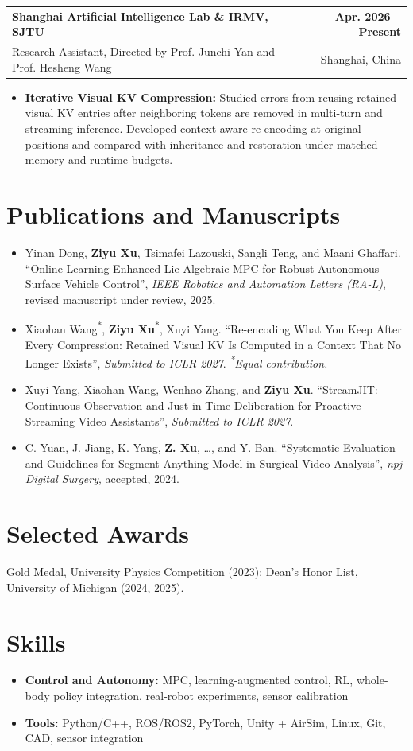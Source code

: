 \documentclass[11pt,letterpaper]{article}
\makeatletter
\newcommand{\resumeSubheading}[4]{
    \begin{tabularx}{\textwidth}{@{}Xr@{}}
        \textbf{#1} & \textbf{#2} \\
        #3 & #4 \\
    \end{tabularx}
}
\newcommand{\resumeItem}[1]{
    \item #1
}
\makeatother
\begin{document}
\resumeSubheading
{Shanghai Artificial Intelligence Lab \& IRMV, SJTU }
{Apr. 2026 -- Present}
{\hspace*{1.4em}Research Assistant, Directed by Prof. Junchi Yan and Prof. Hesheng Wang}
{Shanghai, China}
\begin{itemize}[leftmargin=2.4em, itemsep=0.5pt, topsep=0pt]
\small
\resumeItem{\textbf{Iterative Visual KV Compression:} Studied errors from reusing retained visual KV entries after neighboring tokens are removed in multi-turn and streaming inference. Developed context-aware re-encoding at original positions and compared with inheritance and restoration under matched memory and runtime budgets.}
\end{itemize}

\section*{Publications and Manuscripts}
\begin{itemize}[leftmargin=1.4em,itemsep=3pt,topsep=2pt]
\small
\item Yinan Dong, \textbf{Ziyu Xu}, Tsimafei Lazouski, Sangli Teng, and Maani Ghaffari.      ``Online Learning-Enhanced Lie Algebraic MPC for Robust Autonomous Surface Vehicle Control'',      \textit{IEEE Robotics and Automation Letters (RA-L)}, revised manuscript under review, 2025.
\item Xiaohan Wang\textsuperscript{*}, \textbf{Ziyu Xu}\textsuperscript{*}, Xuyi Yang.      ``Re-encoding What You Keep After Every Compression: Retained Visual KV Is Computed in a Context That No Longer Exists'',      \textit{Submitted to ICLR 2027}. \textit{\textsuperscript{*}Equal contribution.}
\item Xuyi Yang, Xiaohan Wang, Wenhao Zhang, and \textbf{Ziyu Xu}.      ``StreamJIT: Continuous Observation and Just-in-Time Deliberation for Proactive Streaming Video Assistants'',      \textit{Submitted to ICLR 2027}.
\item C. Yuan, J. Jiang, K. Yang, \textbf{Z. Xu}, \ldots, and Y. Ban.      ``Systematic Evaluation and Guidelines for Segment Anything Model in Surgical Video Analysis'',      \textit{npj Digital Surgery}, accepted, 2024.
\end{itemize}
\section*{Selected Awards}
\small Gold Medal, University Physics Competition (2023); Dean's Honor List, University of Michigan (2024, 2025).
\section*{Skills}
\begin{itemize}[leftmargin=2.4em, itemsep=0.5pt, topsep=0pt]
\small
\resumeItem{\textbf{Control and Autonomy:} MPC, learning-augmented control, RL, whole-body policy integration, real-robot experiments, sensor calibration}
\resumeItem{\textbf{Tools:} Python/C++, ROS/ROS2, PyTorch, Unity + AirSim, Linux, Git, CAD, sensor integration}
\end{itemize}
\end{document}
